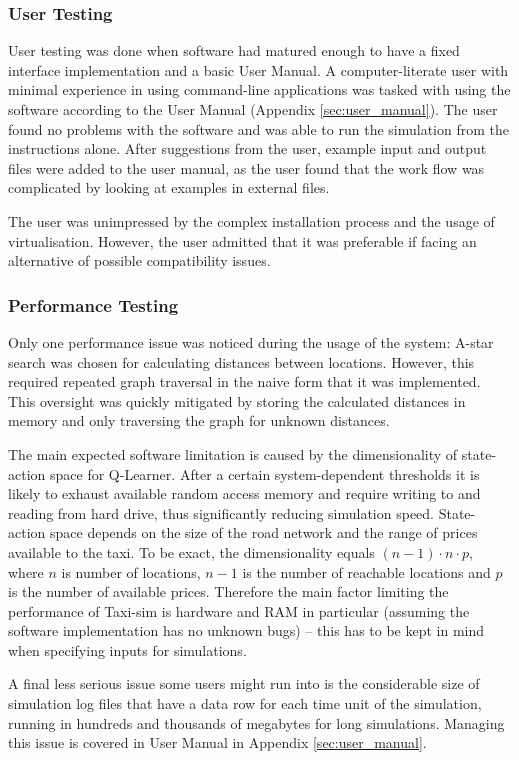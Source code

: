 \subsubsection{User Testing}
\label{sec:implementation:testing:user}

User testing was done when software had matured enough to have a fixed
interface implementation and a basic User Manual. A computer-literate user with
minimal experience in using command-line applications was tasked with using the
software according to the User Manual (Appendix \ref{sec:user_manual}). The
user found no problems with the software and was able to run the simulation
from the instructions alone. After suggestions from the user, example input and
output files were added to the user manual, as the user found that the work
flow was complicated by looking at examples in external files.

The user was unimpressed by the complex installation process and the usage of
virtualisation. However, the user admitted that it was preferable if facing an
alternative of possible compatibility issues.

\subsubsection{Performance Testing}
\label{sec:implementation:testing:performance}

Only one performance issue was noticed during the usage of the system: A-star
search was chosen for calculating distances between locations. However, this
required repeated graph traversal in the naive form that it was implemented.
This oversight was quickly mitigated by storing the calculated distances in
memory and only traversing the graph for unknown distances.

The main expected software limitation is caused by the dimensionality of state-
action space for Q-Learner. After a certain system-dependent thresholds it is
likely to exhaust available random access memory and require writing to and
reading from hard drive, thus significantly reducing simulation speed. State-
action space depends on the size of the road network and the range of prices
available to the taxi. To be exact, the dimensionality equals \( (n-1) \cdot n
\cdot p\), where \(n\) is number of locations, \(n-1\) is the number of
reachable locations and \(p\) is the number of available prices. Therefore the
main factor limiting the performance of Taxi-sim is hardware and RAM in
particular (assuming the software implementation has no unknown bugs) -- this
has to be kept in mind when specifying inputs for simulations.

A final less serious issue some users might run into is the considerable size
of simulation log files that have a data row for each time unit of the
simulation, running in hundreds and thousands of megabytes for long
simulations. Managing this issue is covered in User Manual in Appendix
\ref{sec:user_manual}.
